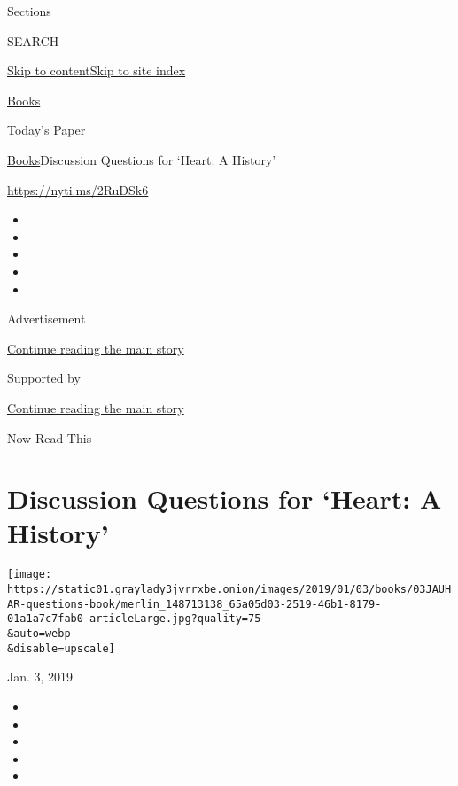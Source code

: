 Sections

SEARCH

\protect\hyperlink{site-content}{Skip to
content}\protect\hyperlink{site-index}{Skip to site index}

\href{https://www.nytimes3xbfgragh.onion/section/books}{Books}

\href{https://myaccount.nytimes3xbfgragh.onion/auth/login?response_type=cookie\&client_id=vi}{}

\href{https://www.nytimes3xbfgragh.onion/section/todayspaper}{Today's
Paper}

\href{/section/books}{Books}\textbar{}Discussion Questions for `Heart: A
History'

\url{https://nyti.ms/2RuDSk6}

\begin{itemize}
\item
\item
\item
\item
\item
\end{itemize}

Advertisement

\protect\hyperlink{after-top}{Continue reading the main story}

Supported by

\protect\hyperlink{after-sponsor}{Continue reading the main story}

Now Read This

\hypertarget{discussion-questions-for-heart-a-history}{%
\section{Discussion Questions for `Heart: A
History'}\label{discussion-questions-for-heart-a-history}}

\texttt{[image: https://static01.graylady3jvrrxbe.onion/images/2019/01/03/books/03JAUHAR-questions-book/merlin\_148713138\_65a05d03-2519-46b1-8179-01a1a7c7fab0-articleLarge.jpg?quality=75\\\&auto=webp\\\&disable=upscale]}

Jan. 3, 2019

\begin{itemize}
\item
\item
\item
\item
\item
\end{itemize}

